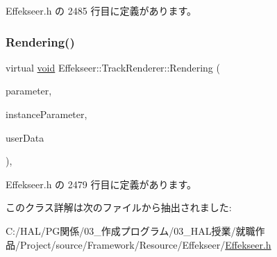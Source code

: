  Effekseer.\+h の 2485 行目に定義があります。

\mbox{\label{class_effekseer_1_1_track_renderer_a5d99f7a58b254166cf938bc739bbb387}} 
\subsubsection{\texorpdfstring{Rendering()}{Rendering()}}
{\footnotesize\ttfamily virtual \mbox{\hyperlink{namespace_effekseer_ab34c4088e512200cf4c2716f168deb56}{void}} Effekseer\+::\+Track\+Renderer\+::\+Rendering (\begin{DoxyParamCaption}\item[{const \mbox{\hyperlink{struct_effekseer_1_1_track_renderer_1_1_node_parameter}{Node\+Parameter}} \&}]{parameter,  }\item[{const \mbox{\hyperlink{struct_effekseer_1_1_track_renderer_1_1_instance_parameter}{Instance\+Parameter}} \&}]{instance\+Parameter,  }\item[{\mbox{\hyperlink{namespace_effekseer_ab34c4088e512200cf4c2716f168deb56}{void}} $\ast$}]{user\+Data }\end{DoxyParamCaption})\hspace{0.3cm}{\ttfamily [inline]}, {\ttfamily [virtual]}}



 Effekseer.\+h の 2479 行目に定義があります。



このクラス詳解は次のファイルから抽出されました\+:\begin{DoxyCompactItemize}
\item 
C\+:/\+H\+A\+L/\+P\+G関係/03\+\_\+作成プログラム/03\+\_\+\+H\+A\+L授業/就職作品/\+Project/source/\+Framework/\+Resource/\+Effekseer/\mbox{\hyperlink{_effekseer_8h}{Effekseer.\+h}}\end{DoxyCompactItemize}
